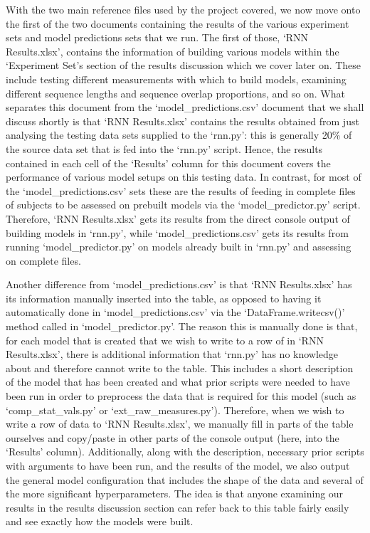 \documentclass[12pt,twoside]{report}
\begin{document}
\quad With the two main reference files used by the project covered, we now move onto the first of the two documents containing the results of the various experiment sets and model predictions sets that we run. The first of those, ‘RNN Results.xlsx’, contains the information of building various models within the ‘Experiment Set’s section of the results discussion which we cover later on. These include testing different measurements with which to build models, examining different sequence lengths and sequence overlap proportions, and so on. What separates this document from the ‘model\_predictions.csv’ document that we shall discuss shortly is that ‘RNN Results.xlsx’ contains the results obtained from just analysing the testing data sets supplied to the ‘rnn.py’: this is generally 20\% of the source data set that is fed into the ‘rnn.py’ script. Hence, the results contained in each cell of the ‘Results’ column for this document covers the performance of various model setups on this testing data. In contrast, for most of the ‘model\_predictions.csv’ sets these are the results of feeding in complete files of subjects to be assessed on prebuilt models via the ‘model\_predictor.py’ script. Therefore, ‘RNN Results.xlsx’ gets its results from the direct console output of building models in ‘rnn.py’, while ‘model\_predictions.csv’ gets its results from running ‘model\_predictor.py’ on models already built in ‘rnn.py’ and assessing on complete files.

\quad Another difference from ‘model\_predictions.csv’ is that ‘RNN Results.xlsx’ has its information manually inserted into the table, as opposed to having it automatically done in ‘model\_predictions.csv’ via the ‘DataFrame.writecsv()’ method called in ‘model\_predictor.py’. The reason this is manually done is that, for each model that is created that we wish to write to a row of in ‘RNN Results.xlsx’, there is additional information that ‘rnn.py’ has no knowledge about and therefore cannot write to the table. This includes a short description of the model that has been created and what prior scripts were needed to have been run in order to preprocess the data that is required for this model (such as ‘comp\_stat\_vals.py’ or ‘ext\_raw\_measures.py’). Therefore, when we wish to write a row of data to ‘RNN Results.xlsx’, we manually fill in parts of the table ourselves and copy/paste in other parts of the console output (here, into the ‘Results’ column). Additionally, along with the description, necessary prior scripts with arguments to have been run, and the results of the model, we also output the general model configuration that includes the shape of the data and several of the more significant hyperparameters. The idea is that anyone examining our results in the results discussion section can refer back to this table fairly easily and see exactly how the models were built.
\end{document}
